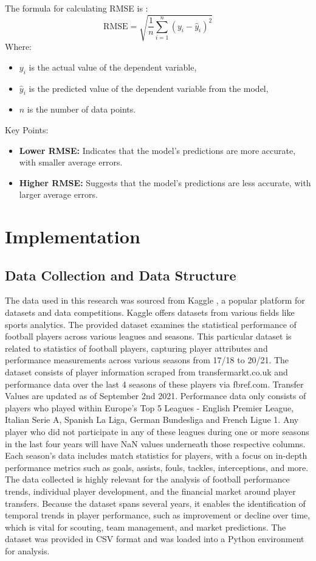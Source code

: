 \documentclass[12pt, a4paper,oneside]{book}
\numberwithin{equation}{section}
\begin{document}
The formula for calculating RMSE is \cite{chatterjees2015}:
\[\text{RMSE} = \sqrt{\frac{1}{n} \sum_{i=1}^{n} (y_i - \hat{y}_i)^2}\]
Where:
\begin{itemize}
    \item \( y_i \) is the actual value of the dependent variable,
    \item \( \hat{y}_i \) is the predicted value of the dependent variable from the model,
    \item \( n \) is the number of data points.
\end{itemize}
Key Points:
\begin{itemize}
    \item \textbf{Lower RMSE:} Indicates that the model's predictions are more accurate, with smaller average errors.
    \item \textbf{Higher RMSE:} Suggests that the model's predictions are less accurate, with larger average errors.
\end{itemize}

\chapter{Implementation}\label{ch:4}

\section{Data Collection and Data Structure}\label{sec:4.1}

The data used in this research was sourced from Kaggle \cite{varma2020}, a popular platform for datasets and data competitions. Kaggle offers datasets from various fields like sports analytics. The provided dataset examines the statistical performance of football players across various leagues and seasons. This particular dataset is related to statistics of football players, capturing player attributes and performance measurements across various seasons from 17/18 to 20/21. The dataset consists of player information scraped from transfermarkt.co.uk and performance data over the last 4 seasons of these players via fbref.com. Transfer Values are updated as of September 2nd 2021. Performance data only consists of players who played within Europe's Top 5 Leagues - English Premier League, Italian Serie A, Spanish La Liga, German Bundesliga and French Ligue 1. Any player who did not participate in any of these leagues during one or more seasons in the last four years will have NaN values underneath those respective columns. Each season’s data includes match statistics for players, with a focus on in-depth performance metrics such as goals, assists, fouls, tackles, interceptions, and more. The data collected is highly relevant for the analysis of football performance trends, individual player development, and the financial market around player transfers. Because the dataset spans several years, it enables the identification of temporal trends in player performance, such as improvement or decline over time, which is vital for scouting, team management, and market predictions. The dataset was provided in CSV format and was loaded into a Python environment for analysis.
\end{document}
